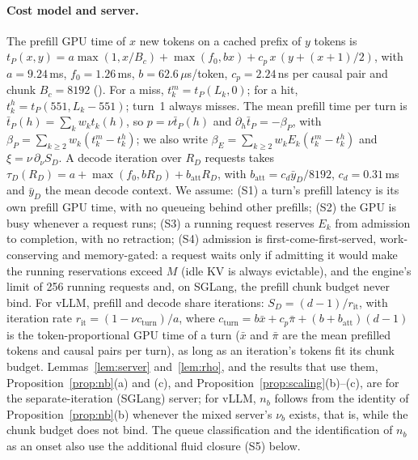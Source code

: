 \paragraph{Cost model and server.} The prefill GPU time of $x$ new tokens on a cached prefix of $y$ tokens is $t_P(x,y)=a\max(1,x/B_c)+\max(f_0,bx)+c_p\,x\,(y+(x+1)/2)$, with $a=9.24$\,ms, $f_0=1.26$\,ms, $b=62.6\,\mu$s/token, $c_p=2.24$\,ns per causal pair and chunk $B_c=8192$ (). For a miss, $t^m_k=t_P(L_k,0)$; for a hit, $t^h_k=t_P(551,L_k-551)$; turn~1 always misses. The mean prefill time per turn is $\bar t_P(h)=\sum_kw_kt_k(h)$, so $p=\nu\bar t_P(h)$ and $\partial_h\bar t_P=-\beta_P$, with $\beta_P=\sum_{k\ge2}w_k(t^m_k-t^h_k)$; we also write $\beta_E=\sum_{k\ge2}w_kE_k(t^m_k-t^h_k)$ and $\xi=\nu\,\partial_\nu S_D$. A decode iteration over $R_D$ requests takes $\tau_D(R_D)=a+\max(f_0,bR_D)+b_{\mathrm{att}}R_D$, with $b_{\mathrm{att}}=c_d\bar y_D/8192$, $c_d=0.31$\,ms and $\bar y_D$ the mean decode context. We assume: (S1) a turn's prefill latency is its own prefill GPU time, with no queueing behind other prefills; (S2) the GPU is busy whenever a request runs; (S3) a running request reserves $E_k$ from admission to completion, with no retraction; (S4) admission is first-come-first-served, work-conserving and memory-gated: a request waits only if admitting it would make the running reservations exceed $M$ (idle KV is always evictable), and the engine's limit of 256 running requests and, on SGLang, the prefill chunk budget never bind. For vLLM, prefill and decode share iterations: $S_D=(d-1)/r_{\mathrm{it}}$, with iteration rate $r_{\mathrm{it}}=(1-\nu c_{\mathrm{turn}})/a$, where $c_{\mathrm{turn}}=b\bar x+c_p\bar\pi+(b+b_{\mathrm{att}})(d-1)$ is the token-proportional GPU time of a turn ($\bar x$ and $\bar\pi$ are the mean prefilled tokens and causal pairs per turn), as long as an iteration's tokens fit its chunk budget. Lemmas~\ref{lem:server} and~\ref{lem:rho}, and the results that use them, Proposition~\ref{prop:nb}(a) and (c), and Proposition~\ref{prop:scaling}(b)--(c), are for the separate-iteration (SGLang) server; for vLLM, $n_b$ follows from the identity of Proposition~\ref{prop:nb}(b) whenever the mixed server's $\nu_b$ exists, that is, while the chunk budget does not bind. The queue classification and the identification of $n_b$ as an onset also use the additional fluid closure (S5) below.

